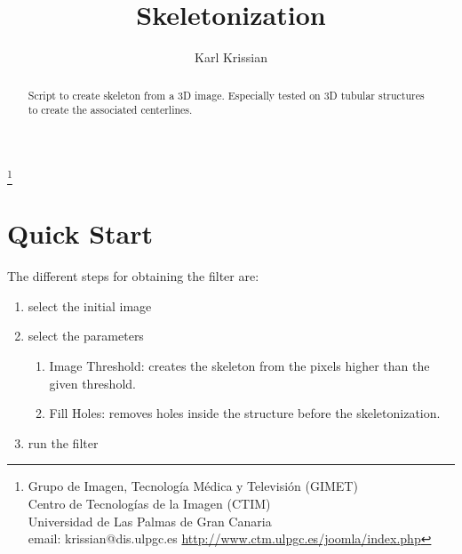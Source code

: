 \documentclass{article}
\begin{document}
\title{Skeletonization}
\author{ Karl Krissian
}
\thanks{
Grupo de Imagen, Tecnolog\'ia M\'edica y Televisi\'on (GIMET)\\
Centro de Tecnolog\'ias de la Imagen (CTIM)\\
Universidad de Las Palmas de Gran Canaria\\
email: krissian@dis.ulpgc.es
\url{http://www.ctm.ulpgc.es/joomla/index.php}
}


\maketitle

\begin{abstract}
Script to create skeleton from a 3D image.
Especially tested on 3D tubular structures to create the associated centerlines.
\end{abstract}


\section{Quick Start}

The different steps for obtaining the filter are:
\begin{enumerate}
  \item select the initial image
  \item select the parameters
    \begin{enumerate}
      \item Image Threshold: creates the skeleton from the pixels higher than the given threshold.
      \item Fill Holes: removes holes inside the structure before the skeletonization.
    \end{enumerate}
  \item run the filter
\end{enumerate}
\end{document}

